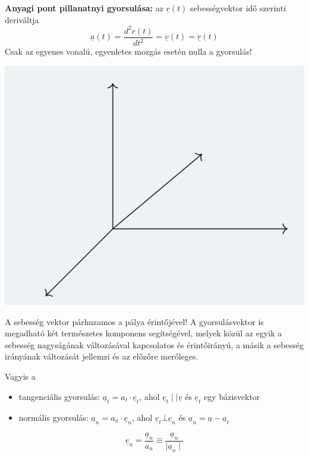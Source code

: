 \begin{tcolorbox}[colback=MidnightBlue!5!white,colframe=MidnightBlue!60!black,title= Definíció]
\textbf{Anyagi pont pillanatnyi gyorsulása:} az \(\underline{r}(t)\) sebességvektor idő szerinti deriváltja
$$\underline{a}(t) = \dfrac{d^2r(t)}{dt^2} = \underline{\dot{v}}(t) = \ddot{\underline{r}}(t)$$
Csak az egyenes vonalú, egyenletes mozgás esetén nulla a gyorsulás!
\begin{multicols}{2}
    \includegraphics[scale = 0.6]{Ea_gyak_1/2.png}
    \columnbreak

    A sebesség vektor párhuzamos a pálya érintőjével!
    A gyorsulásvektor is megadható két természetes komponens segítségével, melyek közül az egyik a sebesség nagyságának változásával kapcsolatos és érintőirányú, a másik a sebesség irányának változását jellemzi és az előzőre merőleges.
\end{multicols}
\end{tcolorbox}
Vagyis a
\begin{itemize}
    \item tangenciális gyorsulás: \(\underline{a}_t = a_t \cdot \underline{e}_t\), ahol \(\underline{e}_t \mid\mid \underline{v}\) és \(\underline{e}_t\) egy bázisvektor
    \item normális gyorsulás: \(\underline{a}_n = a_n \cdot \underline{e}_n\), ahol \(\underline{e}_t \bot  \underline{e}_n\) és \(\underline{a}_n = \underline{a} - \underline{a}_t\)
\end{itemize}
$$\underline{e}_n = \dfrac{\underline{a}_n}{a_n} \equiv \dfrac{\underline{a}_n}{\mid \underline{a}_n \mid} $$
